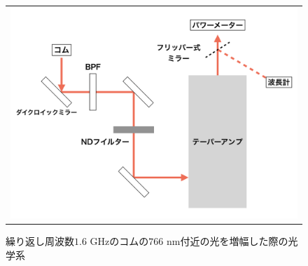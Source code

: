 \documentclass[uplatex, dvipdfmx, a4paper, report, papersize, 11pt]{jsbook}
\begin{document}
\begin{figure}[H]
  \centering
    \begin{tabular}{c}
      \begin{minipage}{1\hsize}
        \centering
          \includegraphics[keepaspectratio,  scale=0.5,  angle=0]
          {figures/chapter4/760_astro_amp_diagram.png}
          \caption{繰り返し周波数$1.6$ GHzのコムの$766$ nm付近の光を増幅した際の光学系}
          \label{760_astro_amp_diagram}
      \end{minipage}
    \end{tabular}
\end{figure}
\end{document}
